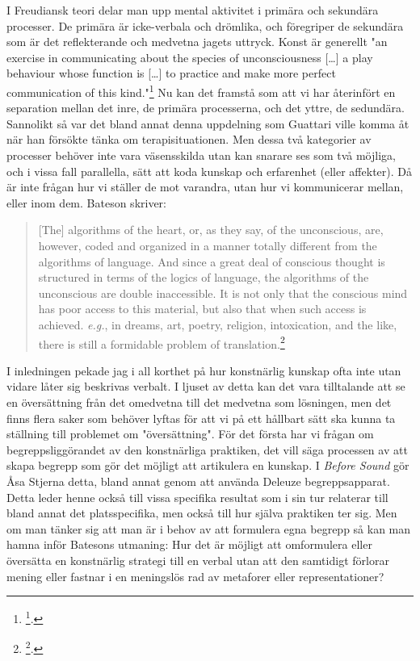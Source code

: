 \documentclass[11pt]{article}
\begin{document}
I Freudiansk teori delar man upp mental aktivitet i primära och
sekundära processer. De primära är icke-verbala och drömlika, och
föregriper de sekundära som är det reflekterande och medvetna jagets
uttryck. Konst är generellt "an exercise in communicating about the
species of unconsciousness [\ldots{}] a play behaviour whose function is
[\ldots{}] to practice and make more perfect communication of this
kind."\footnote{\footcite[s.137]{bateson72}.} Nu kan det framstå som att vi har återinfört en separation
mellan det inre, de primära processerna, och det yttre, de sedundära.
Sannolikt så var det bland annat denna uppdelning som Guattari ville
komma åt när han försökte tänka om terapisituationen. Men dessa två
kategorier av processer behöver inte vara väsensskilda utan kan snarare
ses som två möjliga, och i vissa fall parallella, sätt att koda kunskap
och erfarenhet (eller affekter). Då är inte frågan hur vi ställer de mot
varandra, utan hur vi kommunicerar mellan, eller inom dem. Bateson
skriver:

\begin{quote}
[The] algorithms of the heart, or, as they say, of the unconscious,
are, however, coded and organized in a manner totally different from
the algorithms of language. And since a great deal of conscious
thought is structured in terms of the logics of language, the
algorithms of the unconscious are double inaccessible. It is not only
that the conscious mind has poor access to this material, but also
that when such access is achieved. \emph{e.g.}, in dreams, art, poetry,
religion, intoxication, and the like, there is still a formidable
problem of translation.\footnote{\footcite[s.139]{bateson72}.}
\end{quote}

I inledningen pekade jag i all korthet på hur konstnärlig kunskap ofta
inte utan vidare låter sig beskrivas verbalt. I ljuset av detta kan det
vara tilltalande att se en översättning från det omedvetna till det
medvetna som lösningen, men det finns flera saker som behöver lyftas för
att vi på ett hållbart sätt ska kunna ta ställning till problemet om
"översättning". För det första har vi frågan om begreppsliggörandet av
den konstnärliga praktiken, det vill säga processen av att skapa begrepp
som gör det möjligt att artikulera en kunskap. I \emph{Before Sound} gör Åsa
Stjerna detta, bland annat genom att använda Deleuze begreppsapparat.
Detta leder henne också till vissa specifika resultat som i sin tur
relaterar till bland annat det platsspecifika, men också till hur själva
praktiken ter sig. Men om man tänker sig att man är i behov av att
formulera egna begrepp så kan man hamna inför Batesons utmaning: Hur det
är möjligt att omformulera eller översätta en konstnärlig strategi till
en verbal utan att den samtidigt förlorar mening eller fastnar i en
meningslös rad av metaforer eller representationer?
\end{document}
